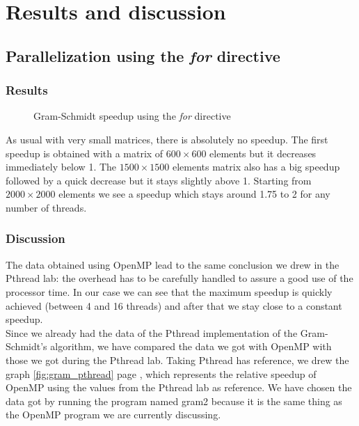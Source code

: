 \chapter{Results and discussion}

\section{Parallelization using the \textit{for} directive}

\subsection{Results}

\begin{figure}[ht]
  \begin{center}
  \end{center}
  \caption{Gram-Schmidt speedup using the \textit{for} directive}
  \label{fig:gram_speedup}
\end{figure} 

As usual with very small matrices, there is absolutely no speedup. The first speedup is obtained with a matrix of $600\times 600$ elements but it decreases immediately below 1. The $1500\times 1500$ elements matrix also has a big speedup followed by a quick decrease but it stays slightly above 1.
Starting from $2000\times 2000$ elements we see a speedup which stays around 1.75 to 2 for any number of threads.


\subsection{Discussion}

The data obtained using OpenMP lead to the same conclusion we drew in the Pthread lab: the overhead has to be carefully handled to assure a good use of the processor time. In our case we can see that the maximum speedup is quickly achieved (between 4 and 16 threads) and after that we stay close to a constant speedup.\\

Since we already had the data of the Pthread implementation of the Gram-Schmidt's
algorithm, we have compared the data we got with OpenMP with those we got during the
Pthread lab. Taking Pthread has reference, we drew the graph \ref{fig:gram_pthread}
page \pageref{fig:gram_pthread}, which represents the relative speedup of OpenMP using the
values from the Pthread lab as reference. We have chosen the data got by running the
program named gram2 because it is the same thing as the OpenMP program we are currently discussing.

